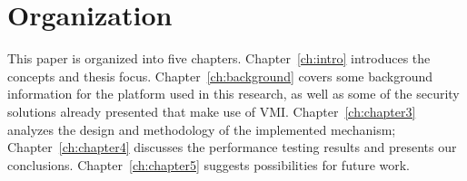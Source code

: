 \section{Organization}\label{sec:organization}
This paper is organized into five chapters. Chapter~\ref{ch:intro} introduces the concepts and thesis focus. Chapter~\ref{ch:background} covers some background information for the platform used in this research, as well as some of the security solutions already presented that make use of \ac{VMI}. Chapter~\ref{ch:chapter3} analyzes the design and methodology of the implemented mechanism; Chapter~\ref{ch:chapter4} discusses the performance testing results and presents our conclusions. Chapter~\ref{ch:chapter5} suggests possibilities for future work.




